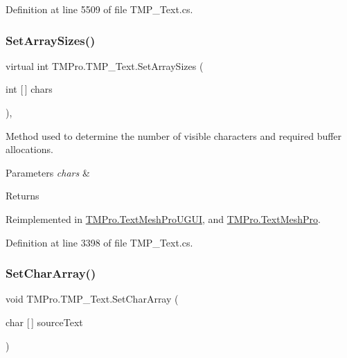 Definition at line 5509 of file T\+M\+P\+\_\+\+Text.\+cs.

\mbox{\label{class_t_m_pro_1_1_t_m_p___text_afb0b5462b35a2486f6e976c2a278702f}} 
\subsubsection{\texorpdfstring{SetArraySizes()}{SetArraySizes()}}
{\footnotesize\ttfamily virtual int T\+M\+Pro.\+T\+M\+P\+\_\+\+Text.\+Set\+Array\+Sizes (\begin{DoxyParamCaption}\item[{int \mbox{[}$\,$\mbox{]}}]{chars }\end{DoxyParamCaption})\hspace{0.3cm}{\ttfamily [protected]}, {\ttfamily [virtual]}}



Method used to determine the number of visible characters and required buffer allocations. 


\begin{DoxyParams}{Parameters}
{\em chars} & \\
\hline
\end{DoxyParams}
\begin{DoxyReturn}{Returns}

\end{DoxyReturn}


Reimplemented in \mbox{\hyperlink{class_t_m_pro_1_1_text_mesh_pro_u_g_u_i_aecb6caf598d9516490f37f0277326eb6}{T\+M\+Pro.\+Text\+Mesh\+Pro\+U\+G\+UI}}, and \mbox{\hyperlink{class_t_m_pro_1_1_text_mesh_pro_a1fcd15c0e6dab2ae7d3cb013d1bdc3c3}{T\+M\+Pro.\+Text\+Mesh\+Pro}}.



Definition at line 3398 of file T\+M\+P\+\_\+\+Text.\+cs.

\mbox{\label{class_t_m_pro_1_1_t_m_p___text_a3a9c8337c13ec0b01a256657b60f995d}} 
\subsubsection{\texorpdfstring{SetCharArray()}{SetCharArray()}\hspace{0.1cm}{\footnotesize\ttfamily [1/3]}}
{\footnotesize\ttfamily void T\+M\+Pro.\+T\+M\+P\+\_\+\+Text.\+Set\+Char\+Array (\begin{DoxyParamCaption}\item[{char \mbox{[}$\,$\mbox{]}}]{source\+Text }\end{DoxyParamCaption})}



